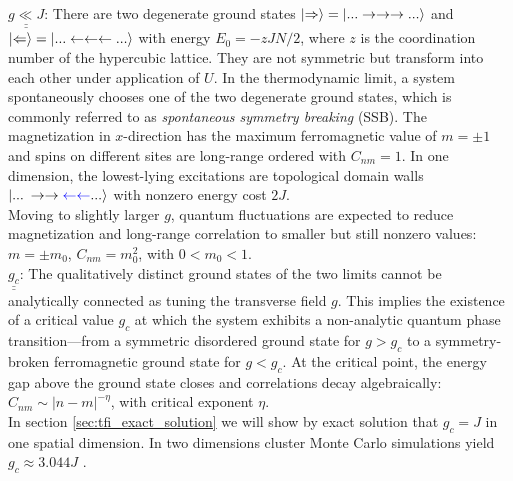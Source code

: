 \noindent $\underline{\underline{g \ll J}}$: There are two degenerate ground states $\ket{\Rightarrow} = \ket{... \rightarrow \rightarrow \rightarrow ...}$ and $\ket{\Leftarrow} = \ket{... \leftarrow \leftarrow \leftarrow ...}$ with energy $E_0 = - zJN/2$, where $z$ is the coordination number of the hypercubic lattice. They are not symmetric but transform into each other under application of $U$. In the thermodynamic limit, a system spontaneously chooses one of the two degenerate ground states, which is commonly referred to as \textit{spontaneous symmetry breaking} (SSB). The magnetization in $x$-direction has the maximum ferromagnetic value of $m = \pm 1$ and spins on different sites are long-range ordered with $C_{nm} = 1$. In one dimension, the lowest-lying excitations are topological domain walls $\ket{... \: \rightarrow \rightarrow \textcolor{blue}{\leftarrow \leftarrow} ...}$ with nonzero energy cost $2J$. \\
Moving to slightly larger $g$, quantum fluctuations are expected to reduce magnetization and long-range correlation to smaller but still nonzero values: $m = \pm m_0$, $C_{nm} = m_0^2$, with $0 < m_0 < 1$. \\
	
\noindent $\underline{\underline{g_c}}$: The qualitatively distinct ground states of the two limits cannot be analytically connected as tuning the transverse field $g$. This implies the existence of a critical value $g_c$ at which the system exhibits a non-analytic quantum phase transition---from a symmetric disordered ground state for $g > g_c$ to a symmetry-broken ferromagnetic ground state for $g < g_c$. At the critical point, the energy gap above the ground state closes and correlations decay algebraically: $C_{nm} \sim \vert n - m \vert^{-\eta}$, with critical exponent $\eta$. \\
In section \ref{sec:tfi_exact_solution} we will show by exact solution that $g_c = J$ in one spatial dimension. In two dimensions cluster Monte Carlo simulations yield $g_c \approx 3.044 J$ \cite{blote2002cluster}.

